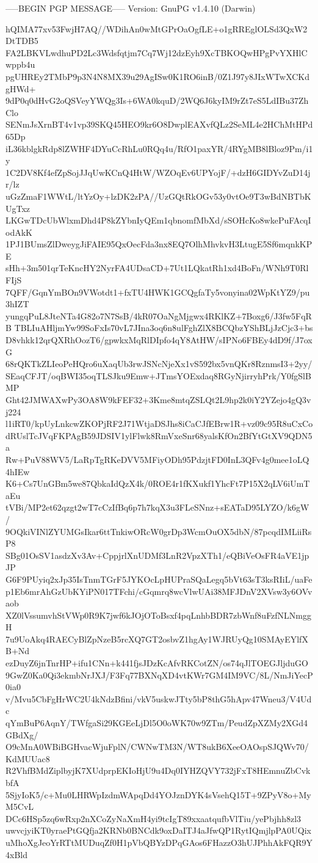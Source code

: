 -----BEGIN PGP MESSAGE-----
Version: GnuPG v1.4.10 (Darwin)

hQIMA77xv53FwjH7AQ//WDihAn0wMtGPrOaOgfLE+o1gRREglOLSd3QxW2DtTDB5
FA2LBKVLwdhuPD2Lc3Wdsfqtjm7Cq7Wj12dzEyh9XcTBKOQwHPgPvYXHlCwppb4u
pgUHREy2TMbP9p3N4N8MX39u29AgISw0K1RO6inB/0Z1J97y8JIxWTwXCKdgHWd+
9dP0q0dHvG2oQSVeyYWQg3Is+6WA0kquD/2WQ6J6kyIM9rZt7eS5LdIBu37ZhClo
SENmJsXrnBT4v1vp39SKQ45HEO9kr6O8DwplEAXvfQLz2SeML4e2HChMtHPd65Dp
iL36kblgkRdp8lZWHF4DYuCcRhLu0RQq4u/RfO1paxYR/4RYgMB8lBloz9Pm/i1y
1C2DV8Kf4efZpSojJJqUwKCnQ4HtW/WZOqEv6UPYojF/+dzH6GIDYvZuD14jr/lz
uGzZmaF1WWtL/ltYzOy+lzDK2zPA//UzGQtRkOGv53y0vtOe9T3wBdNBTbKUgTxz
LKGwTDcUbWlxmDhd4P8kZYbnIyQEm1qbnomfMbXd/sSOHcKo8wkePuFAcqIodAkK
1PJ1BUmsZlDweygJiFAIE95QxOecFda3nx8EQ7OlhMhvkvH3LtugE5Sf6mqnkKPE
sHh+3m501qrTeKncHY2NyrFA4UDsaCD+7Ut1LQkatRh1xd4BoFn/WNh9T0RlFIjS
7QFF/GqnYmBOn9VWotdt1+fxTU4HWK1GCQgfaTy5vonyina02WpKtYZ9/pu3hIZT
yungqPuL8JteNTa4G82o7N7SsB/4kR07OaNgMjgwx4RKlKZ+7Boxg6/J3fw5FqRB
TBLIuAHljmYw99SoFxIs70vL7JIna3oq6n8ulFghZlX8BCQbzYShBLjJzCjc3+bs
D8vhkk12qrQXRhOozT6/gpwkxMqRlDIpfo4qY8AtHW/sIPNo6FBEy4dD9f/J7oxG
68rQKTkZLIeoPeHQro6uXaqUb3rwJSNcNjeXx1vS592bx5vnQKr8RznmsI3+2yy/
SEaqCFJT/oqBWI35oqTLSJku9Emw+JTmsYOExdaq8RGyNjirryhPrk/Y0fgSlBMP
Ght42JMWAXwPy3OA8W9kFEF32+3Kme8mtqZSLQt2L9hp2k0iY2YZejo4gQ3vj224
l1iRT0/kpUyLnkcwZKOPjRF2J71WtjaDSJhs8iCaCJfEBrw1R+vz09c95R8uCxCo
dRUslTcJVqFKPAgB59JDSIV1ylFlwk8RmVxeSnr68yalsKfOn2BfYtGtXV9QDN5a
Rw+PuV88WV5/LaRpTgRKeDVV5MFiyODh95PdzjtFD0InL3QFv4g0mee1oLQ4hIEw
K6+Cs7UnGBm5we87QbkaIdQzX4k/0ROE4r1fKXukf1YhcFt7P15X2qLV6iUmTaEu
tVBi/MP2et62qzgt2wT7cCzIfBq6p7h7kqX3u3FLeSNnz+sEATaD95LYZO/k6gW/
9OQkiVINlZYUMGsIkar6ttTnkiwORcW0grDp3WcmOuOX5dbN/87pcqdIMLiiRsP8
SBg01OsSV1asdzXv3Av+CppjrlXnUDMf3LnR2VpzXTh1/eQBiVeOsFR4aVE1jpJP
G6F9PUyiq2xJp35IsTnmTGrF5JYKOcLpHUPraSQaLegq5bVt63sT3ksRIiL/uaFe
p1Eb6mrAhGzUbKYiPN017TFchi/cGqmrq8wcVlwUAi38MFJDnV2XVsw3y6OVvaob
XZ0lVssumvhStVWp0R9K7jwf6kJOjOToBsxf4pqLnhbBDR7zbWnf8uFzfNLNmggH
7u9UoAkq4RAECyBlZpNzeB5rcXQ7GT2osbvZ1hgAy1WJRUyQg10SMAyEYlfXB+Nd
ezDuyZ6jnTnrHP+ifu1CNn+k441fjsJDzKcAfvRKCotZN/os74qJlTOEGJljduGO
9GwZ0Ka0Qi3ekmbNrJXJ/F3Fq77BXNqXD4vtKWr7GM4IM9VC/8L/NmJiYecP0ia0
v/Mvu5CbFgHrWC2U4kNdzBfini/vkV5uskwJTty5bP8thG5hApv47Wneu3/V4Udc
qYmBuP6AqnY/TWfgaSi29KGEeLjDl5O0oWK70w9ZTm/PeudZpXZMy2XGd4GBdXg/
O9cMnA0WBiBGHvacWjuFplN/CWNwTM3N/WT8ukB6XeeOAOspSJQWv70/KdMUUac8
R2VhfBMdZiplbyjK7XUdprpEKIoHjU9u4Dq0IYHZQVY732jFxT8HEmnuZbCvkbfA
5SjyIoK5/c+Mu0LHRWpIzdmWApqDd4YOJznDYK4sVsehQ15T+9ZPyV8o+MyM5CvL
DCc6HSp5zq6wRxp2nXCoZyNaXmH4yi9tcIgT89xxaatqufbVlTiu/yePbjhh8zl3
uwvcjyiKT0yraePtGQfja2KRNb0BNCdk9oxDaITJ4aJfwQP1RytIQmjlpPA0UQix
uMhoXgJeoYrRTtMUDuqZf0H1pVbQBYzDPqGAos6FHazzO3hUJPhhAkFQR9Y4xBld
